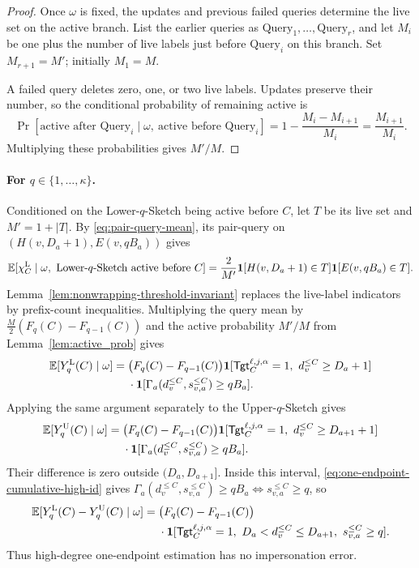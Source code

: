 \begin{proof}
Once $\omega$ is fixed, the updates and previous failed queries determine the live set on the active branch. List the earlier queries as $\text{Query}_1,\ldots,\text{Query}_r$, and let $M_i$ be one plus the number of live labels just before $\text{Query}_i$ on this branch. Set $M_{r+1}=M'$; initially $M_1=M$.

A failed query deletes zero, one, or two live labels. Updates preserve their number, so the conditional probability of remaining active is
\[
\Pr[\text{active after }\text{Query}_i\mid\omega,\ \text{active before }\text{Query}_i]
=1-\frac{M_i-M_{i+1}}{M_i}
=\frac{M_{i+1}}{M_i}.
\]
Multiplying these probabilities gives $M'/M$.
\end{proof}

\paragraph{For $q\in\{1,\ldots,\kappa\}$.}
Conditioned on the Lower-$q$-Sketch being active before $C$, let $T$ be its live set and $M'=1+|T|$. By \eqref{eq:pair-query-mean}, its pair-query on $(H(v,D_a+1),E(v,qB_a))$ gives
\[
\mathbb E[\chi_C^{\mathrm L}\mid\omega,\ \text{Lower-$q$-Sketch active before }C]
=\frac{2}{M'}\mathbf 1[H(v,D_a+1)\in T]\mathbf 1[E(v,qB_a)\in T].
\]
Lemma~\ref{lem:nonwrapping-threshold-invariant} replaces the live-label indicators by prefix-count inequalities. Multiplying the query mean by $\frac M2(F_q(C)-F_{q-1}(C))$ and the active probability $M'/M$ from Lemma~\ref{lem:active_prob} gives
\[
\begin{aligned}
\mathbb E[Y_q^{\mathrm L}(C)\mid\omega]
={}&\bigl(F_q(C)-F_{q-1}(C)\bigr)
\mathbf 1[\mathsf{Tgt}^{\ell,j,\alpha}_{C}=1,\ d_v^{\le C}\ge D_a+1]\\
&\cdot\mathbf 1[\Gamma_a(d_v^{\le C},s_{v,a}^{\le C})\ge qB_a].
\end{aligned}
\]
Applying the same argument separately to the Upper-$q$-Sketch gives
\[
\begin{aligned}
\mathbb E[Y_q^{\mathrm U}(C)\mid\omega]
={}&\bigl(F_q(C)-F_{q-1}(C)\bigr)
\mathbf 1[\mathsf{Tgt}^{\ell,j,\alpha}_{C}=1,\ d_v^{\le C}\ge D_{a+1}+1]\\
&\cdot\mathbf 1[\Gamma_a(d_v^{\le C},s_{v,a}^{\le C})\ge qB_a].
\end{aligned}
\]
Their difference is zero outside $(D_a,D_{a+1}]$. Inside this interval, \eqref{eq:one-endpoint-cumulative-high-id} gives $\Gamma_a(d_v^{\le C},s_{v,a}^{\le C})\ge qB_a\iff s_{v,a}^{\le C}\ge q$, so
\begin{equation}\label{eq:bigq}
\begin{aligned}
\mathbb E[Y_q^{\mathrm L}(C)-Y_q^{\mathrm U}(C)\mid\omega]
={}&\bigl(F_q(C)-F_{q-1}(C)\bigr)\\
&\cdot\mathbf 1[\mathsf{Tgt}^{\ell,j,\alpha}_{C}=1,\ D_a<d_v^{\le C}\le D_{a+1},\ s_{v,a}^{\le C}\ge q].
\end{aligned}
\end{equation}
Thus high-degree one-endpoint estimation has no impersonation error.

